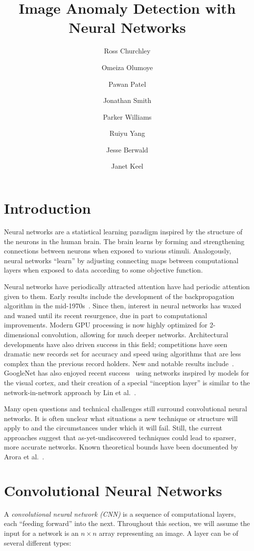 \documentclass{article}
\title{Image Anomaly Detection with Neural Networks}
\author[1]{Ross Churchley}
\author[2]{Omeiza Olumoye}
\author[3]{Pawan Patel}
\author[4]{Jonathan Smith}
\author[5]{Parker Williams}
\author[3]{Ruiyu Yang}
\author[6]{Jesse Berwald}
\author[6]{Janet Keel}
\affil[1]{Simon Fraser University}
\affil[2]{University of Texas}
\affil[3]{Indiana University}
\affil[4]{Acadia University}
\affil[5]{University of California}
\affil[6]{Target Corporation}
\begin{document}
\maketitle
\onehalfspace
\section{Introduction}
  Neural networks are a statistical learning paradigm inspired by the structure of the neurons in the human brain.  The brain learns by forming and strengthening connections between neurons when exposed to various stimuli. Analogously, neural networks ``learn'' by adjusting connecting maps between computational layers when exposed to data according to some objective function.

  Neural networks have periodically attracted attention have had periodic attention given to them. Early results include the development of the backpropagation algorithm in the mid-1970s~\cite{werbos}. Since then, interest in neural networks has waxed and waned until its recent resurgence, due in part to computational improvements. Modern GPU processing is now highly optimized for 2-dimensional convolution, allowing for much deeper networks. Architectural developments have also driven success in this field; competitions have seen dramatic new records set for accuracy and speed using algorithms that are less complex than the previous record holders. New and notable results include~\cite{INC,RFH}. GoogleNet has also enjoyed recent success~\cite{GDWC} using networks inspired by models for the visual cortex, and their creation of a special ``inception layer'' is similar to the network-in-network approach by Lin et al.~\cite{NIN}.

  Many open questions and technical challenges still surround convolutional neural networks. It is often unclear what situations a new technique or structure will apply to and the circumstances under which it will fail.   Still, the current approaches suggest that as-yet-undiscovered techniques could lead to sparser, more accurate networks. Known theoretical bounds have been documented by Arora et al.~\cite{PB}.


\section{Convolutional Neural Networks}

  A \emph{convolutional neural network (CNN)} is a sequence of computational layers, each ``feeding forward'' into the next. Throughout this section, we will assume the input for a network is an $n\times n$ array representing an image. A layer can be of several different types:
\end{document}
